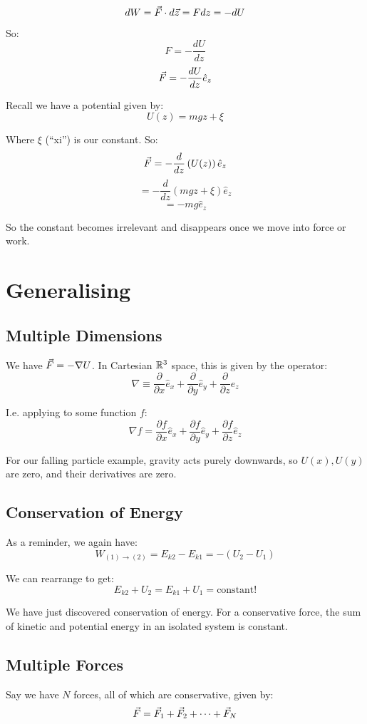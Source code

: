 \[
    dW = \vec{F} \cdot d \vec{z} = Fdz = -d U
\]
So:
\[
    F = -\frac{dU}{dz}
\]
\[
    \vec{F} = - \frac{dU}{dz} \hat{e}_z
\]

Recall we have a potential given by:
\[
    U(z) = mgz + \xi
\]

Where $\xi$ (``xi'') is our constant. So:
\[
    \vec{F} = - \frac{d}{dz} \left(U(z)\right) \hat{e}_z
\]
\[
    = - \frac{d}{dz} \left(mgz + \xi\right) \hat{e}_z
\]
\[
    = -mg \hat{e}_z
\]

So the constant becomes irrelevant and disappears once we move into force or work.

\section{Generalising}
\subsection{Multiple Dimensions}

We have $\vec{F} = - \nabla U$. In Cartesian $\mathbb{R}^3$ space, this is given by the operator:
\[
    \nabla \equiv \frac{\partial}{\partial x} \hat{e}_x+ \frac{\partial}{\partial y} \hat{e}_y+ \frac{\partial}{\partial z} \hat{e}_z
\]

I.e. applying to some function $f$:
\[
    \nabla f = \frac{\partial f}{\partial x} \hat{e}_x+ \frac{\partial f}{\partial y} \hat{e}_y+ \frac{\partial f}{\partial z} \hat{e}_z
\]

For our falling particle example, gravity acts purely downwards, so $U(x), U(y)$ are zero, and their derivatives are zero.

\subsection{Conservation of Energy}

As a reminder, we again have:
\[
    W_{(1) \to (2)} = E_{k2} - E_{k1} = - (U_2 - U_1)
\]

We can rearrange to get:
\[
    E_{k2} + U_2 = E_{k1} + U_1 = \text{constant!}
\]

We have just discovered conservation of energy. For a conservative force, the sum of kinetic and potential energy in an isolated system is constant.

\subsection{Multiple Forces}
Say we have $N$ forces, all of which are conservative, given by:
\[
    \vec{F} = \vec{F}_1 + \vec{F}_2 + \cdots + \vec{F}_N
\]

